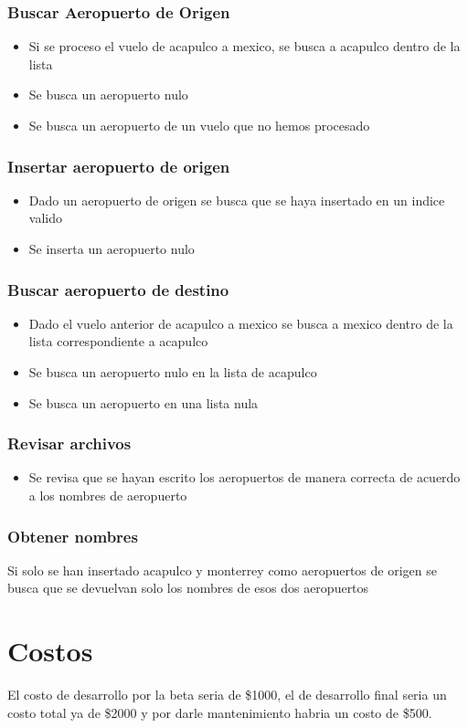 \documentclass[12pt]{article}
\begin{document}
\subsubsection{Buscar Aeropuerto de Origen}
\begin{itemize}
\item Si se proceso el vuelo de acapulco a mexico, se busca a acapulco dentro de la lista
\item Se busca un aeropuerto nulo
\item Se busca un aeropuerto de un vuelo que no hemos procesado
\end{itemize}
\subsubsection{Insertar aeropuerto de origen}
\begin{itemize}
\item Dado un aeropuerto de origen se busca que se haya insertado en un indice valido
\item Se inserta un aeropuerto nulo
\end{itemize}
\subsubsection{Buscar aeropuerto de destino}
\begin{itemize}
\item Dado el vuelo anterior de acapulco a mexico se busca a mexico dentro de la lista correspondiente a acapulco
\item Se busca un aeropuerto nulo en la lista de acapulco
\item Se busca un aeropuerto en una lista nula
\end{itemize}
\subsubsection{Revisar archivos}
\begin{itemize}
\item Se revisa que se hayan escrito los aeropuertos de manera correcta de acuerdo a los nombres de aeropuerto
\end{itemize}
\subsubsection{Obtener nombres}
Si solo se han insertado acapulco y monterrey como aeropuertos de origen se busca que se devuelvan solo los nombres de esos dos aeropuertos
\section{Costos}
El costo de desarrollo por la beta seria de \$1000, el de desarrollo final seria un costo total ya de \$2000 y por darle mantenimiento habria un costo de \$500.
\end{document}
